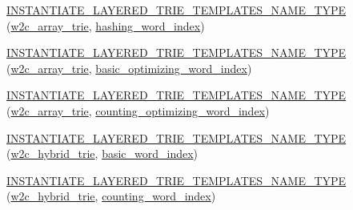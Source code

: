 \begin{DoxyCompactItemize}
\item 
\hyperlink{namespaceuva_1_1smt_1_1bpbd_1_1server_1_1lm_a707486ca1948696fb403b4a1202b0fb5}{I\+N\+S\+T\+A\+N\+T\+I\+A\+T\+E\+\_\+\+L\+A\+Y\+E\+R\+E\+D\+\_\+\+T\+R\+I\+E\+\_\+\+T\+E\+M\+P\+L\+A\+T\+E\+S\+\_\+\+N\+A\+M\+E\+\_\+\+T\+Y\+P\+E} (\hyperlink{classuva_1_1smt_1_1bpbd_1_1server_1_1lm_1_1w2c__array__trie}{w2c\+\_\+array\+\_\+trie}, \hyperlink{classuva_1_1smt_1_1bpbd_1_1server_1_1lm_1_1dictionary_1_1hashing__word__index}{hashing\+\_\+word\+\_\+index})
\item 
\hyperlink{namespaceuva_1_1smt_1_1bpbd_1_1server_1_1lm_abee29bef9db07b4f11f9ef424147c3f7}{I\+N\+S\+T\+A\+N\+T\+I\+A\+T\+E\+\_\+\+L\+A\+Y\+E\+R\+E\+D\+\_\+\+T\+R\+I\+E\+\_\+\+T\+E\+M\+P\+L\+A\+T\+E\+S\+\_\+\+N\+A\+M\+E\+\_\+\+T\+Y\+P\+E} (\hyperlink{classuva_1_1smt_1_1bpbd_1_1server_1_1lm_1_1w2c__array__trie}{w2c\+\_\+array\+\_\+trie}, \hyperlink{namespaceuva_1_1smt_1_1bpbd_1_1server_1_1lm_1_1dictionary_a3001583c904eec702b4a4125082a7ecd}{basic\+\_\+optimizing\+\_\+word\+\_\+index})
\item 
\hyperlink{namespaceuva_1_1smt_1_1bpbd_1_1server_1_1lm_afd9d7e48f55efee028d4f433d29051d3}{I\+N\+S\+T\+A\+N\+T\+I\+A\+T\+E\+\_\+\+L\+A\+Y\+E\+R\+E\+D\+\_\+\+T\+R\+I\+E\+\_\+\+T\+E\+M\+P\+L\+A\+T\+E\+S\+\_\+\+N\+A\+M\+E\+\_\+\+T\+Y\+P\+E} (\hyperlink{classuva_1_1smt_1_1bpbd_1_1server_1_1lm_1_1w2c__array__trie}{w2c\+\_\+array\+\_\+trie}, \hyperlink{namespaceuva_1_1smt_1_1bpbd_1_1server_1_1lm_1_1dictionary_a61cbd647b15de785ccf4cdd26661c366}{counting\+\_\+optimizing\+\_\+word\+\_\+index})
\item 
\hyperlink{namespaceuva_1_1smt_1_1bpbd_1_1server_1_1lm_a607b4443f42a3d303e80fc4a5dc2a435}{I\+N\+S\+T\+A\+N\+T\+I\+A\+T\+E\+\_\+\+L\+A\+Y\+E\+R\+E\+D\+\_\+\+T\+R\+I\+E\+\_\+\+T\+E\+M\+P\+L\+A\+T\+E\+S\+\_\+\+N\+A\+M\+E\+\_\+\+T\+Y\+P\+E} (\hyperlink{classuva_1_1smt_1_1bpbd_1_1server_1_1lm_1_1w2c__hybrid__trie}{w2c\+\_\+hybrid\+\_\+trie}, \hyperlink{classuva_1_1smt_1_1bpbd_1_1server_1_1lm_1_1dictionary_1_1basic__word__index}{basic\+\_\+word\+\_\+index})
\item 
\hyperlink{namespaceuva_1_1smt_1_1bpbd_1_1server_1_1lm_aea9882f617e2d3983cd96a7b1f34f5a5}{I\+N\+S\+T\+A\+N\+T\+I\+A\+T\+E\+\_\+\+L\+A\+Y\+E\+R\+E\+D\+\_\+\+T\+R\+I\+E\+\_\+\+T\+E\+M\+P\+L\+A\+T\+E\+S\+\_\+\+N\+A\+M\+E\+\_\+\+T\+Y\+P\+E} (\hyperlink{classuva_1_1smt_1_1bpbd_1_1server_1_1lm_1_1w2c__hybrid__trie}{w2c\+\_\+hybrid\+\_\+trie}, \hyperlink{classuva_1_1smt_1_1bpbd_1_1server_1_1lm_1_1dictionary_1_1counting__word__index}{counting\+\_\+word\+\_\+index})
\item 

\end{DoxyCompactItemize}
